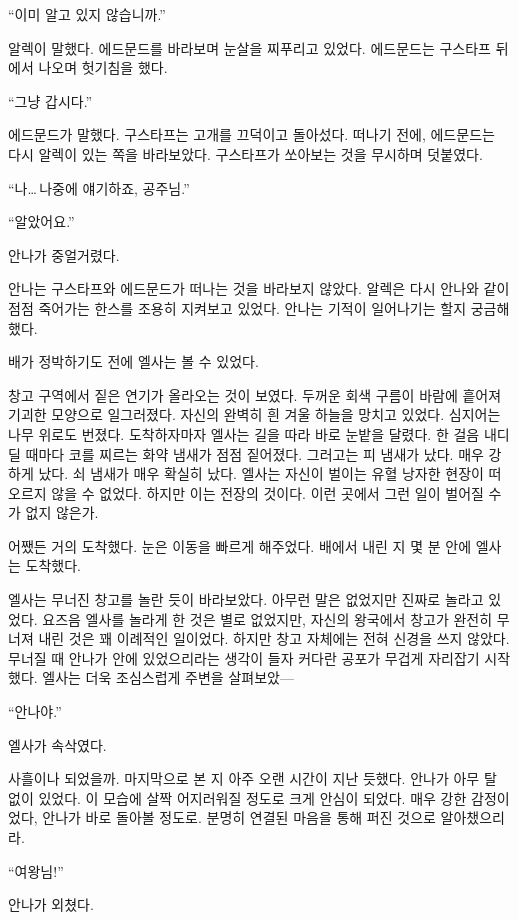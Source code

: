 ``이미 알고 있지 않습니까.''

알렉이 말했다. 에드문드를 바라보며 눈살을 찌푸리고 있었다. 에드문드는 구스타프 뒤에서 나오며 헛기침을 했다.

``그냥 갑시다.''

에드문드가 말했다. 구스타프는 고개를 끄덕이고 돌아섰다. 떠나기 전에, 에드문드는 다시 알렉이 있는 쪽을 바라보았다. 구스타프가 쏘아보는 것을 무시하며 덧붙였다.

``나\ldots\,나중에 얘기하죠, 공주님.''

``알았어요.''

안나가 중얼거렸다.

안나는 구스타프와 에드문드가 떠나는 것을 바라보지 않았다. 알렉은 다시 안나와 같이  점점 죽어가는 한스를 조용히 지켜보고 있었다. 안나는 기적이 일어나기는 할지 궁금해했다.

\textbreak

배가 정박하기도 전에 엘사는 볼 수 있었다.

창고 구역에서 짙은 연기가 올라오는 것이 보였다. 두꺼운 회색 구름이 바람에 흩어져 기괴한 모양으로 일그러졌다. 자신의 완벽히 흰 겨울 하늘을 망치고 있었다. 심지어는 나무 위로도 번졌다. 도착하자마자 엘사는 길을 따라 바로 눈밭을 달렸다. 한 걸음 내디딜 때마다 코를 찌르는 화약 냄새가 점점 짙어졌다. 그러고는 피 냄새가 났다. 매우 강하게 났다. 쇠 냄새가 매우 확실히 났다. 엘사는 자신이 벌이는 유혈 낭자한 현장이 떠오르지 않을 수 없었다. 하지만 이는 전장의 것이다. 이런 곳에서 그런 일이 벌어질 수가 없지 않은가.

어쨌든 거의 도착했다. 눈은 이동을 빠르게 해주었다. 배에서 내린 지 몇 분 안에 엘사는 도착했다.

엘사는 무너진 창고를 놀란 듯이 바라보았다. 아무런 말은 없었지만 진짜로 놀라고 있었다. 요즈음 엘사를 놀라게 한 것은 별로 없었지만, 자신의 왕국에서 창고가 완전히 무너져 내린 것은 꽤 이례적인 일이었다. 하지만 창고 자체에는 전혀 신경을 쓰지 않았다. 무너질 때 안나가 안에 있었으리라는 생각이 들자 커다란 공포가 무겁게 자리잡기 시작했다. 엘사는 더욱 조심스럽게 주변을 살펴보았—

``안나야.''

엘사가 속삭였다.

사흘이나 되었을까. 마지막으로 본 지 아주 오랜 시간이 지난 듯했다. 안나가 아무 탈 없이 있었다. 이 모습에 살짝 어지러워질 정도로 크게 안심이 되었다. 매우 강한 감정이었다, 안나가 바로 돌아볼 정도로. 분명히 연결된 마음을 통해 퍼진 것으로 알아챘으리라.

``여왕님!''

안나가 외쳤다.

